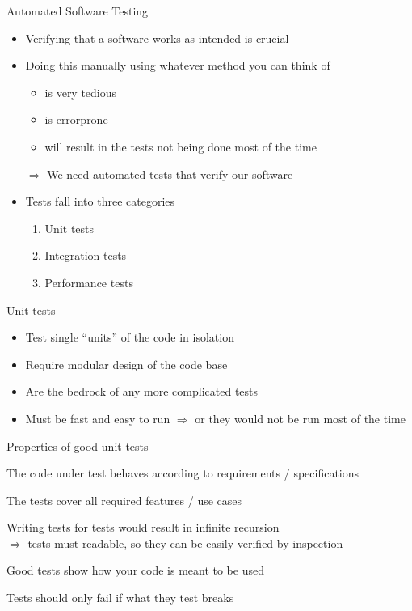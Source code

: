 \begin{frame}[c]{Automated Software Testing}
  \begin{itemize}
    \item Verifying that a software works as intended is crucial
    \item Doing this manually using whatever method you can think of
      \begin{itemize}
        \item is very tedious
        \item is errorprone
        \item will result in the tests not being done most of the time
      \end{itemize}
    \item[$\Rightarrow$] We need automated tests that verify our software
    \item Tests fall into three categories
      \begin{enumerate}
        \item Unit tests
        \item Integration tests
        \item Performance tests
      \end{enumerate}
  \end{itemize}
\end{frame}

\begin{frame}[c]{Unit tests}
  \begin{itemize}
    \item Test single \enquote{units} of the code in isolation
    \item Require modular design of the code base
    \item Are the bedrock of any more complicated tests
    \item Must be fast and easy to run $⇒$ or they would not be run most of the time
  \end{itemize}
\end{frame}

\begin{frame}[c]{Properties of good unit tests}
  \begin{description}[Demonstrability]
    \item[Existence] \faSmileWink[regular]
    \item[Correctness] The code under test behaves according to requirements / specifications
    \item[Completeness] The tests cover all required features / use cases
    \item[Readability] Writing tests for tests would result in infinite recursion\\
      $⇒$ tests must readable, so they can be easily verified by inspection
    \item[Demonstrability] Good tests show how your code is meant to be used
    \item[Resilience] Tests should only fail if what they test breaks
  \end{description}
\end{frame}

